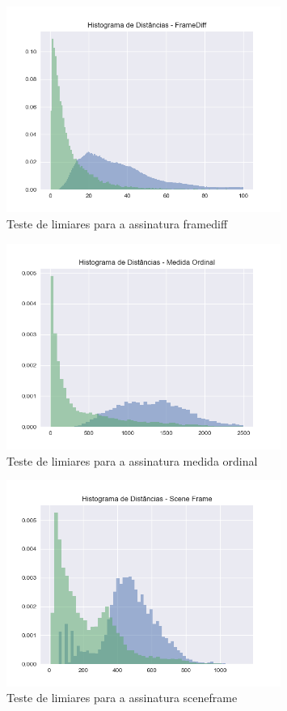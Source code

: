 \begin{figure}[h]
	\centering
	\label{fig:limiares-framediff}
	\caption{Teste de limiares para a assinatura framediff}
	\includegraphics[width=0.8\textwidth]{dados/figuras/experimentos/histograma_FrameDiff.png}
\end{figure}
\begin{figure}[h]
	\centering
	\label{fig:limiares-medidaordinal}
	\caption{Teste de limiares para a assinatura medida ordinal}
	\includegraphics[width=0.8\textwidth]{dados/figuras/experimentos/histograma_Medida_Ordinal.png}
\end{figure}
\begin{figure}[h]
	\centering
	\label{fig:limiares-sceneframe}
	\caption{Teste de limiares para a assinatura sceneframe}
	\includegraphics[width=0.8\textwidth]{dados/figuras/experimentos/histograma_Scene_Frame.png}
\end{figure}
